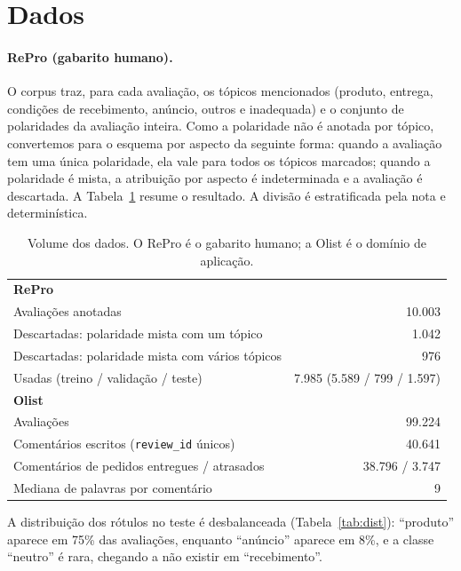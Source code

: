 \documentclass[12pt,a4paper]{article}
\begin{document}
\section{Dados}

\paragraph{RePro (gabarito humano).} O corpus traz, para cada avaliação, os tópicos mencionados (produto, entrega, condições de recebimento, anúncio, outros e inadequada) e o conjunto de polaridades da avaliação inteira. Como a polaridade não é anotada por tópico, convertemos para o esquema por aspecto da seguinte forma: quando a avaliação tem uma única polaridade, ela vale para todos os tópicos marcados; quando a polaridade é mista, a atribuição por aspecto é indeterminada e a avaliação é descartada. A Tabela~\ref{tab:dados} resume o resultado. A divisão é estratificada pela nota e determinística.

\begin{table}[ht]
\centering
\caption{Volume dos dados. O RePro é o gabarito humano; a Olist é o domínio de aplicação.}
\label{tab:dados}
\begin{tabular}{lr}
\toprule
\textbf{RePro} & \\
Avaliações anotadas & 10.003 \\
Descartadas: polaridade mista com um tópico & 1.042 \\
Descartadas: polaridade mista com vários tópicos & 976 \\
Usadas (treino / validação / teste) & 7.985 (5.589 / 799 / 1.597) \\
\midrule
\textbf{Olist} & \\
Avaliações & 99.224 \\
Comentários escritos (\texttt{review\_id} únicos) & 40.641 \\
Comentários de pedidos entregues / atrasados & 38.796 / 3.747 \\
Mediana de palavras por comentário & 9 \\
\bottomrule
\end{tabular}
\end{table}

A distribuição dos rótulos no teste é desbalanceada (Tabela~\ref{tab:dist}): ``produto'' aparece em 75\% das avaliações, enquanto ``anúncio'' aparece em 8\%, e a classe ``neutro'' é rara, chegando a não existir em ``recebimento''.
\end{document}

